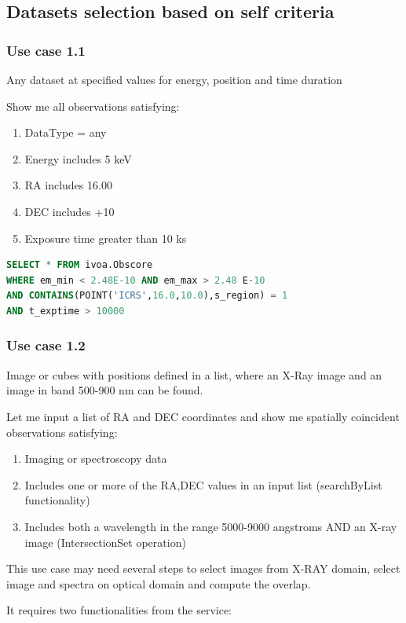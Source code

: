 \documentclass[11pt,a4paper]{ivoa}
\begin{document}
\subsection{Datasets selection based on self criteria}
\subsubsection{Use case 1.1}
Any dataset at specified values for energy, position and time duration 

Show me all observations satisfying:

\begin{enumerate}
\item DataType = any
\item Energy includes 5 keV
\item RA includes 16.00
\item DEC includes +10
\item Exposure time greater than 10 ks
\end{enumerate}

\begin{lstlisting}[language=SQL,flexiblecolumns=true]
SELECT * FROM ivoa.Obscore
WHERE em_min < 2.48E-10 AND em_max > 2.48 E-10
AND CONTAINS(POINT('ICRS',16.0,10.0),s_region) = 1
AND t_exptime > 10000
\end{lstlisting}

\subsubsection{Use case 1.2}
Image or cubes with positions defined in a list, where an X-Ray image and an image in band 500-900 nm can be found.

Let me input a list of RA and DEC coordinates and show me spatially coincident observations satisfying:

\begin{enumerate}
\item Imaging or spectroscopy data
\item Includes one or more of the RA,DEC values in an input list (searchByList functionality)
\item Includes both a wavelength in the range 5000-9000 angstroms AND an X-ray image (IntersectionSet operation)
\end{enumerate}
This use case may need several steps to select images from X-RAY domain, select image and spectra on optical domain and
compute the overlap.

It requires two functionalities from the service: 
\end{document}
